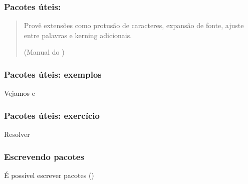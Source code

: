 \begin{frame}
  \frametitle{Pacotes úteis: }
  \LARGE
  \begin{quote}
  Provê extensões como protusão de caracteres, expansão de fonte, ajuste entre
  palavras e kerning adicionais.\par\hfill (Manual do )
  \end{quote}
\end{frame}

\begin{frame}
  \frametitle{Pacotes úteis: exemplos}
  \LARGE
  Vejamos  e
\end{frame}

\begin{frame}
  \frametitle{Pacotes úteis: exercício}
  \LARGE
  Resolver 
\end{frame}

\begin{frame}
  \frametitle{Escrevendo pacotes}
  \LARGE
  É possível escrever pacotes ()
\end{frame}
